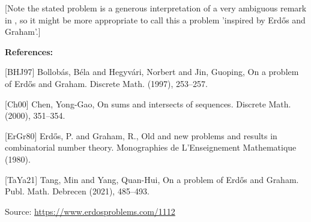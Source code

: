 \documentclass{article}
\begin{document}
[Note the stated problem is a generous interpretation of a very ambiguous remark in \cite{ErGr80}, so it might be more appropriate to call this a problem 'inspired by Erd\H{o}s and Graham'.]

\bigskip
\noindent\textbf{References:}

[BHJ97] Bollob\'{a}s, B\'{e}la and Hegyv\'{a}ri, Norbert and Jin, Guoping, On a problem of {E}rd\H{o}s and {G}raham. Discrete Math. (1997), 253--257.
 
 [Ch00] Chen, Yong-Gao, On sums and intersects of sequences. Discrete Math. (2000), 351--354.
 
 [ErGr80] Erd\H{o}s, P. and Graham, R., Old and new problems and results in combinatorial number theory. Monographies de L'Enseignement Mathematique (1980).
 
 [TaYa21] Tang, Min and Yang, Quan-Hui, On a problem of {E}rd\H{o}s and {G}raham. Publ. Math. Debrecen (2021), 485--493.

\bigskip
\noindent\small{Source: \url{https://www.erdosproblems.com/1112}}
\end{document}
